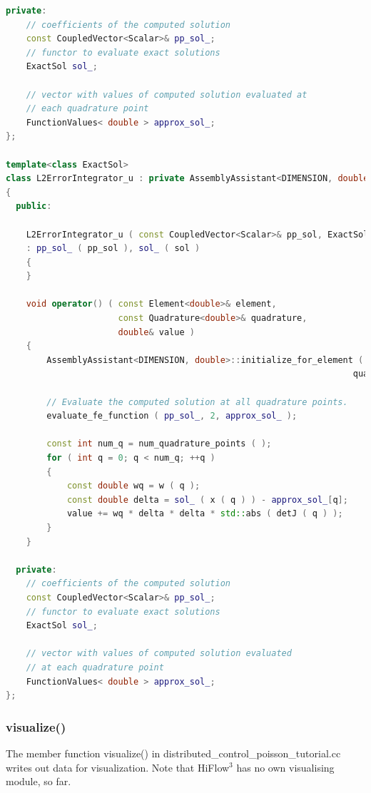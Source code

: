 \documentclass[a4paper, 11pt, twoside]{article}
\begin{document}
\begin{lstlisting}[language=C++, basicstyle={\footnotesize, \ttfamily}, keywordstyle=\color{blue}, numbers=none, tabsize=4]
  private:
    // coefficients of the computed solution
    const CoupledVector<Scalar>& pp_sol_;
    // functor to evaluate exact solutions
    ExactSol sol_;

    // vector with values of computed solution evaluated at
    // each quadrature point
    FunctionValues< double > approx_sol_;
};

template<class ExactSol>
class L2ErrorIntegrator_u : private AssemblyAssistant<DIMENSION, double>
{
  public:

    L2ErrorIntegrator_u ( const CoupledVector<Scalar>& pp_sol, ExactSol& sol )
    : pp_sol_ ( pp_sol ), sol_ ( sol )
    {
    }

    void operator() ( const Element<double>& element, 
                      const Quadrature<double>& quadrature,
                      double& value )
    {
        AssemblyAssistant<DIMENSION, double>::initialize_for_element ( element,
                                                                    quadrature );

        // Evaluate the computed solution at all quadrature points.
        evaluate_fe_function ( pp_sol_, 2, approx_sol_ );

        const int num_q = num_quadrature_points ( );
        for ( int q = 0; q < num_q; ++q )
        {
            const double wq = w ( q );
            const double delta = sol_ ( x ( q ) ) - approx_sol_[q];
            value += wq * delta * delta * std::abs ( detJ ( q ) );
        }
    }

  private:
    // coefficients of the computed solution
    const CoupledVector<Scalar>& pp_sol_;
    // functor to evaluate exact solutions
    ExactSol sol_;

    // vector with values of computed solution evaluated 
    // at each quadrature point
    FunctionValues< double > approx_sol_;
};
\end{lstlisting}


%
%

\subsubsection{visualize()}\label{sec:visualize}
The member function visualize() in distributed\_control\_poisson\_tutorial.cc writes out data for visualization. Note that HiFlow$^3$ has no own visualising module, so far.
\end{document}
